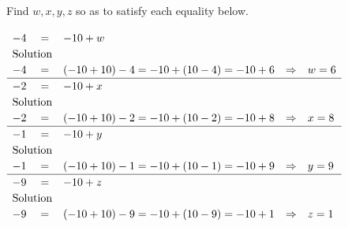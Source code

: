 \begin{frame}
\begin{example}
Find $w,x,y,z$ so as to satisfy each equality below.

$\renewcommand{\arraystretch}{1.2}
\begin{array}{rclcl}
-4 &=& -10+w\\
\multicolumn{2}{c}{\text{Solution}}\\
-4 &=& (-10+10)-4=-10 + (10-4)=-10+6&\Rightarrow& w =6\\\hline 
-2 &=& -10 +x\\
\multicolumn{2}{c}{\text{Solution}}\\
-2 &=& (-10+10)-2=-10 + (10-2)=-10+8&\Rightarrow& x =8\\\hline 
-1 &=& -10 +y\\
\multicolumn{2}{c}{\text{Solution}}\\
-1 &=& (-10+10)-1=-10 + (10-1)=-10+9&\Rightarrow& y =9\\\hline 
-9 &=& -10 +z\\
\multicolumn{2}{c}{\text{Solution}}\\
-9 &=& (-10+10)-9=-10 + (10-9)=-10+1&\Rightarrow& z =1\\
\end{array}$

\end{example}
\end{frame}